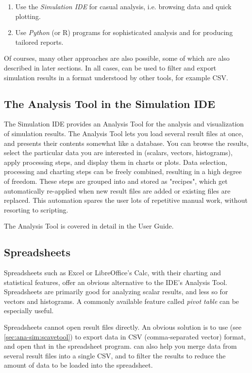 \begin{enumerate}
  \item Use the \textit{Simulation IDE} for casual analysis, i.e. browsing data
        and quick plotting.
  \item Use \textit{Python} (or R) programs for sophisticated analysis and for
        producing tailored reports.
\end{enumerate}

Of courses, many other approaches are also possible, some of which are also
described in later sections. In all cases,  can be used to
filter and export simulation results in a format understood by other tools, for
example CSV.


\subsection{The Analysis Tool in the Simulation IDE}
\label{sec:ana-sim:analysis-tool}

The Simulation IDE provides an Analysis Tool for the analysis and visualization
of simulation results. The Analysis Tool lets you load several result files
at once, and presents their contents somewhat like a database. You can
browse the results, select the particular data you are interested in
(scalars, vectors, histograms), apply processing steps, and display them
in charts or plots. Data selection, processing and charting steps
can be freely combined, resulting in a high degree of freedom.
These steps are grouped into and stored as "recipes", which get automatically
re-applied when new result files are added or existing files are
replaced. This automation spares the user lots of repetitive manual work,
without resorting to scripting.

The Analysis Tool is covered in detail in the User Guide.


\subsection{Spreadsheets}
\label{sec:ana-sim:spreadsheet-programs}

Spreadsheets such as Excel or LibreOffice's Calc, with their charting and
statistical features, offer an obvious alternative to the IDE's Analysis Tool.
Spreadsheets are primarily good for analyzing scalar results, and less so for
vectors and histograms. A commonly available feature called \textit{pivot table}
can be especially useful.

Spreadsheets cannot open result files directly. An obvious solution is to use
 (see \ref{sec:ana-sim:scavetool}) to export data in CSV
(comma-separated vector) format, and open that in the spreadsheet program.
 can also help you merge data from several result
files into a single CSV, and to filter the results to reduce the amount
of data to be loaded into the spreadsheet.

